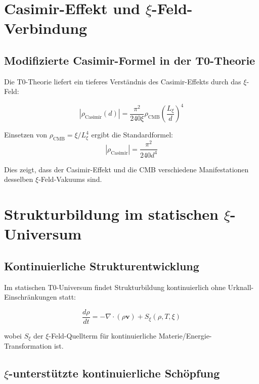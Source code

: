 \documentclass[12pt,a4paper]{article}
\begin{document}
	\section{Casimir-Effekt und $\xi$-Feld-Verbindung}
	
	\subsection{Modifizierte Casimir-Formel in der T0-Theorie}
	
	Die T0-Theorie liefert ein tieferes Verständnis des Casimir-Effekts durch das $\xi$-Feld:
	
	\begin{equation}
		|\rho_{\text{Casimir}}(d)| = \frac{\pi^2}{240 \xi} \rho_{\text{CMB}} \left(\frac{L_\xi}{d}\right)^4
	\end{equation}
	
	Einsetzen von $\rho_{\text{CMB}} = \xi/L_\xi^4$ ergibt die Standardformel:
	\begin{equation}
		|\rho_{\text{Casimir}}| = \frac{\pi^2}{240 d^4}
	\end{equation}
	
	Dies zeigt, dass der Casimir-Effekt und die CMB verschiedene Manifestationen desselben $\xi$-Feld-Vakuums sind.
	
	\section{Strukturbildung im statischen $\xi$-Universum}
	
	\subsection{Kontinuierliche Strukturentwicklung}
	
	Im statischen T0-Universum findet Strukturbildung kontinuierlich ohne Urknall-Einschränkungen statt:
	
	\begin{equation}
		\frac{d\rho}{dt} = -\nabla \cdot (\rho \mathbf{v}) + S_\xi(\rho, T, \xi)
	\end{equation}
	
	wobei $S_\xi$ der $\xi$-Feld-Quellterm für kontinuierliche Materie/Energie-Transformation ist.
	
	\subsection{$\xi$-unterstützte kontinuierliche Schöpfung}
	
\end{document}
